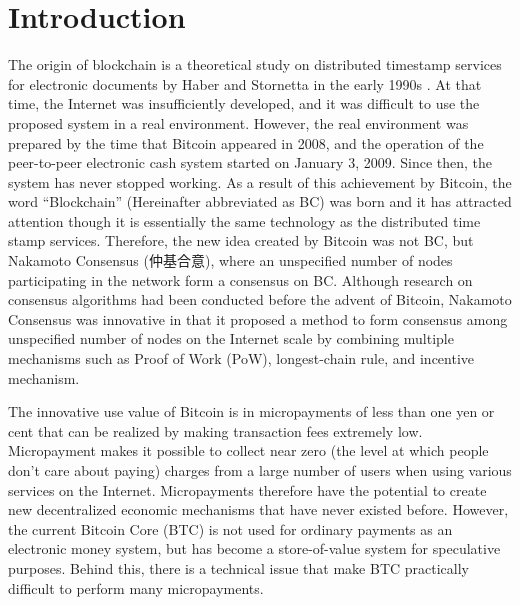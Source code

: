 \documentclass[graybox]{svmult}
\begin{document}
\section{Introduction}
\label{sec:intro}
The origin of blockchain is a theoretical study on distributed timestamp services for electronic documents by Haber and Stornetta in the early 1990s
\cite{HS1991,BHS1993,HS1997}.
At that time, the Internet was insufficiently developed, and it was difficult to use the proposed system in a real environment.
However, the real environment was prepared by the time that Bitcoin \cite{nakamoto} appeared in 2008, and the operation of the peer-to-peer electronic cash system started on January 3, 2009.
Since then, the system has never stopped working. 
As a result of this achievement by Bitcoin, the word ``Blockchain'' (Hereinafter abbreviated as BC) was born and it has attracted attention though it is essentially the same technology as the distributed time stamp services.
Therefore, the new idea created by Bitcoin was not BC, but Nakamoto Consensus (仲基合意), where an unspecified number of nodes participating in the network form a consensus on BC. 
Although research on consensus algorithms had been conducted before the advent of Bitcoin, Nakamoto Consensus was innovative in that it proposed a method to form consensus among unspecified number of nodes on the Internet scale by combining multiple mechanisms such as Proof of Work (PoW)\cite{DN1993,JJ1999}, longest-chain rule, and incentive mechanism.


The innovative use value of Bitcoin is in micropayments of less than one yen or cent that can be realized by making transaction fees extremely low. 
Micropayment makes it possible to collect near zero (the level at which people don't care about paying) charges from a large number of users when using various services on the Internet.
Micropayments therefore have the potential to create new decentralized economic mechanisms that have never existed before.
However, the current Bitcoin Core (BTC) \cite{btc} is not used for ordinary payments as an electronic money system, but has become a store-of-value system for speculative purposes. 
Behind this, there is a technical issue that make BTC practically difficult to perform many micropayments. 
\end{document}
